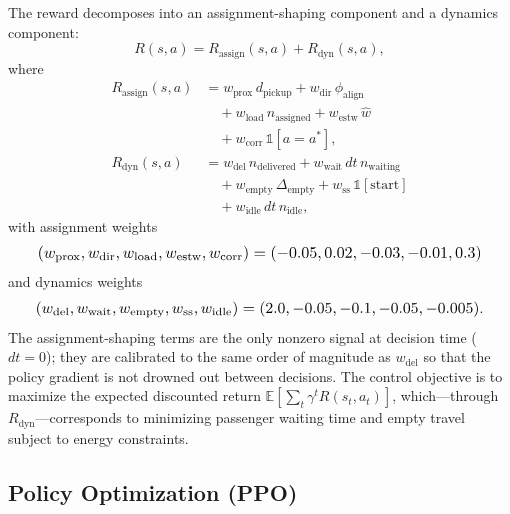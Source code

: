 \documentclass{ieeeaccess}
\begin{document}
The reward decomposes into an assignment-shaping component and a
dynamics component:
\begin{equation}
R(s, a) = R_{\mathrm{assign}}(s, a) + R_{\mathrm{dyn}}(s, a),
\end{equation}
where
\begin{align}
R_{\mathrm{assign}}(s, a) &= w_{\mathrm{prox}}\, d_{\mathrm{pickup}} +
w_{\mathrm{dir}}\, \phi_{\mathrm{align}} \nonumber \\
&\quad + w_{\mathrm{load}}\, n_{\mathrm{assigned}} +
w_{\mathrm{estw}}\, \hat{w} \nonumber \\
&\quad + w_{\mathrm{corr}}\, \mathbb{1}[a = a^*], \\
R_{\mathrm{dyn}}(s, a) &= w_{\mathrm{del}}\, n_{\mathrm{delivered}} +
w_{\mathrm{wait}}\, dt\, n_{\mathrm{waiting}} \nonumber \\
&\quad + w_{\mathrm{empty}}\, \Delta_{\mathrm{empty}} +
w_{\mathrm{ss}}\, \mathbb{1}[\mathrm{start}] \nonumber \\
&\quad + w_{\mathrm{idle}}\, dt\, n_{\mathrm{idle}},
\end{align}
with assignment weights
\begin{equation}
\resizebox{0.92\columnwidth}{!}{$
(w_{\mathrm{prox}}, w_{\mathrm{dir}}, w_{\mathrm{load}},
w_{\mathrm{estw}}, w_{\mathrm{corr}}) = (-0.05, 0.02, -0.03,
-0.01, 0.3)
$}
\end{equation}
and dynamics weights
\begin{equation}
\resizebox{0.92\columnwidth}{!}{$
(w_{\mathrm{del}}, w_{\mathrm{wait}}, w_{\mathrm{empty}},
w_{\mathrm{ss}}, w_{\mathrm{idle}}) = (2.0, -0.05, -0.1,
-0.05, -0.005)
$}.
\end{equation}
The assignment-shaping terms are the only nonzero signal at decision
time ($dt = 0$); they are calibrated to the same order of magnitude as
$w_{\mathrm{del}}$ so that the policy gradient is not drowned out
between decisions. The control objective is to maximize
the expected discounted return
$\mathbb{E}[\sum_t \gamma^t R(s_t, a_t)]$, which---through
$R_{\mathrm{dyn}}$---corresponds to minimizing passenger waiting time
and empty travel subject to energy constraints.

\subsection{Policy Optimization (PPO)}
\end{document}
